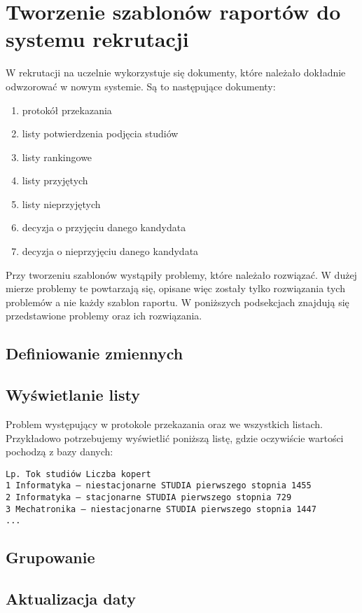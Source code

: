 \section{Tworzenie szablonów raportów do systemu rekrutacji}

W rekrutacji na uczelnie wykorzystuje się dokumenty, które należało dokładnie odwzorować w nowym systemie. Są to następujące dokumenty:\\
\begin{enumerate}
\item protokół przekazania
\item listy potwierdzenia podjęcia studiów 
\item listy rankingowe 
\item listy przyjętych
\item listy nieprzyjętych
\item decyzja o przyjęciu danego kandydata
\item decyzja o nieprzyjęciu danego kandydata 
\end{enumerate}
\vspace{5mm}
Przy tworzeniu szablonów wystąpiły problemy, które należało rozwiązać.  W dużej mierze problemy te powtarzają się,  opisane więc zostały tylko rozwiązania tych problemów a nie każdy szablon raportu. W poniższych podsekcjach znajdują się przedstawione problemy oraz ich rozwiązania.
\subsection{Definiowanie zmiennych}



\subsection{Wyświetlanie listy}
Problem występujący w protokole przekazania oraz we wszystkich listach. Przykładowo potrzebujemy wyświetlić poniższą listę, gdzie oczywiście wartości pochodzą z bazy danych:
\begin{lstlisting}
Lp. Tok studiów Liczba kopert
1 Informatyka — niestacjonarne STUDIA pierwszego stopnia 1455
2 Informatyka — stacjonarne STUDIA pierwszego stopnia 729
3 Mechatronika — niestacjonarne STUDIA pierwszego stopnia 1447
...
\end{lstlisting}

\subsection{Grupowanie}
\subsection{Aktualizacja daty}